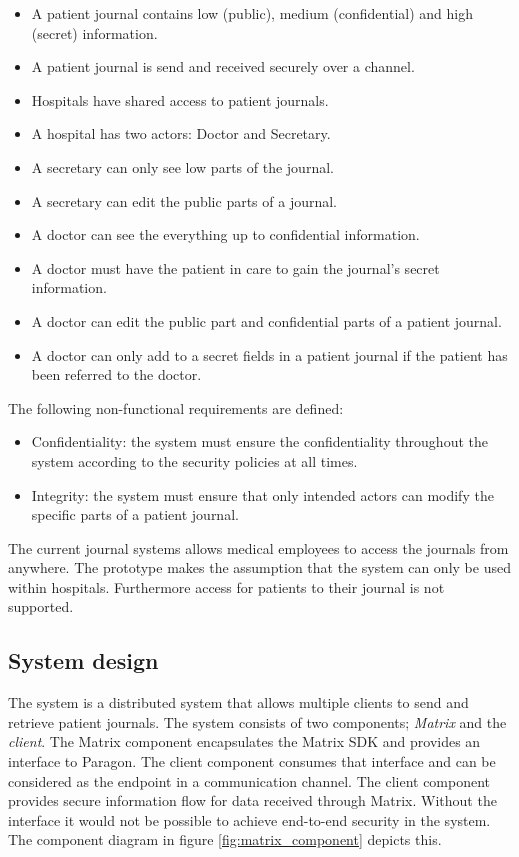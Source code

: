 \begin{itemize}
	\item A patient journal contains low (public), medium (confidential) and high (secret)  information.
	\item A patient journal is send and received securely over a channel.
	\item Hospitals have shared access to patient journals. 
	\item A hospital has two actors: Doctor and Secretary.
	\item A secretary can only see low parts of the journal.
	\item A secretary can edit the public parts of a journal.
	\item A doctor can see the everything up to confidential information.
	\item A doctor must have the patient in care to gain the journal's secret information.
	\item A doctor can edit the public part and confidential parts of a patient journal.
	\item A doctor can only add to a secret fields in a patient journal if the patient has been referred to the doctor.
\end{itemize}

The following non-functional requirements are defined:

\begin{itemize}
	\item Confidentiality: the system must ensure the confidentiality throughout the system according to the security policies at all times.
	\item Integrity: the system must ensure that only intended actors can modify the specific parts of a patient journal.
\end{itemize}

The current journal systems allows medical employees to access the journals from anywhere. The prototype makes the assumption that the system can only be used within hospitals. Furthermore access for patients to their journal is not supported.

\subsection{System design} \label{systemdesign}

The system is a distributed system that allows multiple clients to send and retrieve patient journals. The system consists of two components; \emph{Matrix} and the \emph{client}. The Matrix component encapsulates the Matrix SDK and provides an interface to Paragon. The client component consumes that interface and can be considered as the endpoint in a communication channel. The client component provides secure information flow for data received through Matrix. Without the interface it would not be possible to achieve end-to-end security in the system. 
The component diagram in figure \ref{fig:matrix_component} depicts this.

